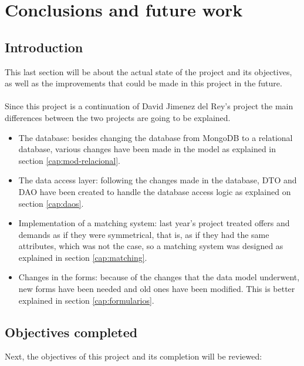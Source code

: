 \documentclass[11pt]{book}
\begin{document}
	
	\chapter{Conclusions and future work}
	\section{Introduction}
	This last section will be about the actual state of the project and its objectives, as well as the improvements that could be made in this project in the future.\\\\
	Since this project is a continuation of David Jimenez del Rey's project the main differences between the two projects are going to be explained.
	\begin{itemize}
		\item The database: besides changing the database from MongoDB to a relational database, various changes have been made in the model as explained in section \ref{cap:mod-relacional}.
		\item The data access layer: following the changes made in the database, DTO and DAO have been created to handle the database access logic as explained on section \ref{cap:daos}.
		\item Implementation of a matching system: last year's project treated offers and demands as if they were symmetrical, that is, as if they had the same attributes, which was not the case, so a matching system was designed as explained in section \ref{cap:matching}.
		\item Changes in the forms: because of the changes that the data model underwent, new forms have been needed and old ones have been modified. This is better explained in section \ref{cap:formularios}.
	\end{itemize}
	
	\section{Objectives completed}
	Next, the objectives of this project and its completion will be reviewed:
	
\end{document}
